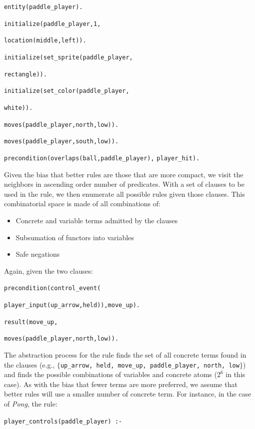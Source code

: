 \documentclass[12pt]{report}
\begin{document}
\noindent \texttt{entity(paddle\_player).}

\noindent \texttt{initialize(paddle\_player,1,}

\texttt{location(middle,left)).}

\noindent \texttt{initialize(set\_sprite(paddle\_player,}

\texttt{rectangle)).}

\noindent \texttt{initialize(set\_color(paddle\_player,}

\texttt{white)).}

\noindent \texttt{moves(paddle\_player,north,low)).}

\noindent \texttt{moves(paddle\_player,south,low)).}

\noindent \texttt{precondition(overlaps(ball,paddle\_player),}
\texttt{player\_hit).}

Given the bias that better rules are those that are more compact, we visit the neighbors in ascending order number of predicates. With a set of clauses to be used in the rule, we then enumerate all possible rules given those clauses. This combinatorial space is made of all combinations of:

\begin{itemize}
\item Concrete and variable terms admitted by the clauses
\item Subsumation of functors into variables
\item Safe negations
\end{itemize}

Again, given the two clauses:


\noindent \texttt{precondition(control\_event(}

\texttt{player\_input(up\_arrow,held)),move\_up).}

\noindent \texttt{result(move\_up,}

\texttt{moves(paddle\_player,north,low)).}

The abstraction process for the rule finds the set of all concrete terms found in the clauses (e.g., $\{$\texttt{up\_arrow, held, move\_up, paddle\_player, north, low}$\}$) and finds the possible  combinations of variables and concrete atoms ($2^6$ in this case). As with the bias that fewer terms are more preferred, we assume that better rules will use a smaller number of concrete term. For instance, in the case of \textit{Pong}, the rule:

\noindent \texttt{player\_controls(paddle\_player) :- }
\end{document}
